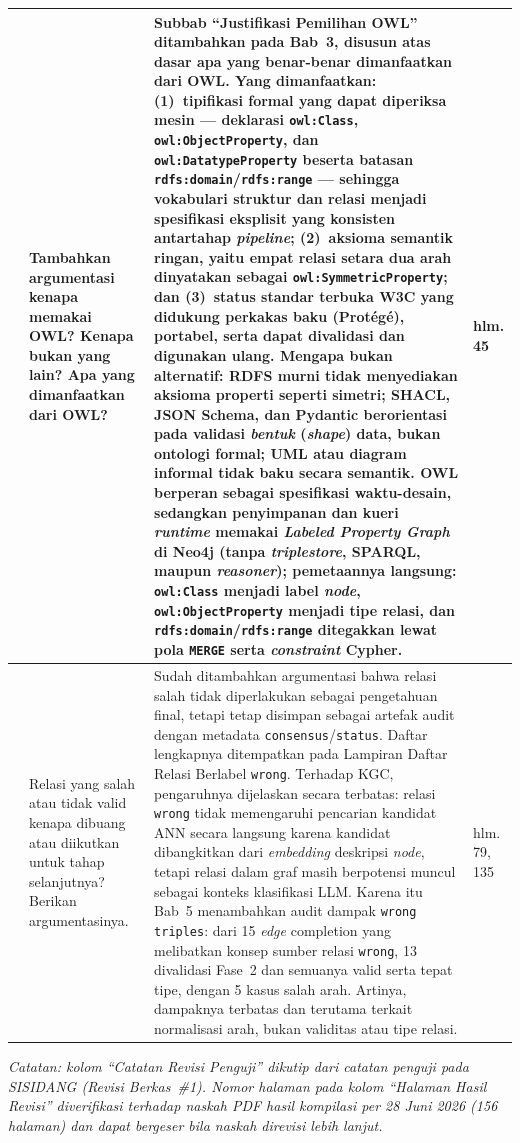 \documentclass[12pt, a4paper]{article}
\begin{document}
\begin{longtable}{|
  >{\centering\arraybackslash}p{\revisionNoCol}|
  p{\revisionNoteCol}|
  p{\revisionResultCol}|
  >{\centering\arraybackslash}p{\revisionPageCol}|}
\hline
12 & Tambahkan argumentasi kenapa memakai OWL? Kenapa bukan yang lain? Apa
yang dimanfaatkan dari OWL? &
Subbab ``Justifikasi Pemilihan OWL'' ditambahkan pada Bab~3, disusun atas
dasar apa yang benar-benar dimanfaatkan dari OWL. \textbf{Yang dimanfaatkan:}
(1)~tipifikasi formal yang dapat diperiksa mesin --- deklarasi
\texttt{owl:Class}, \texttt{owl:ObjectProperty}, dan
\texttt{owl:DatatypeProperty} beserta batasan
\texttt{rdfs:domain}/\texttt{rdfs:range} --- sehingga vokabulari struktur dan
relasi menjadi spesifikasi eksplisit yang konsisten antartahap
\textit{pipeline}; (2)~aksioma semantik ringan, yaitu empat relasi setara dua
arah dinyatakan sebagai \texttt{owl:SymmetricProperty}; dan (3)~status standar
terbuka W3C yang didukung perkakas baku (Prot\'eg\'e), portabel, serta dapat
divalidasi dan digunakan ulang. \textbf{Mengapa bukan alternatif:} RDFS murni
tidak menyediakan aksioma properti seperti simetri; SHACL, JSON Schema, dan
Pydantic berorientasi pada validasi \textit{bentuk} (\textit{shape}) data,
bukan ontologi formal; UML atau diagram informal tidak baku secara semantik.
OWL berperan sebagai \textbf{spesifikasi waktu-desain}, sedangkan penyimpanan
dan kueri \textit{runtime} memakai \textit{Labeled Property Graph} di Neo4j
(tanpa \textit{triplestore}, SPARQL, maupun \textit{reasoner}); pemetaannya
langsung: \texttt{owl:Class} menjadi label \textit{node},
\texttt{owl:ObjectProperty} menjadi tipe relasi, dan
\texttt{rdfs:domain}/\texttt{rdfs:range} ditegakkan lewat pola \texttt{MERGE}
serta \textit{constraint} Cypher. &
hlm. 45 \\
\hline
13 & Relasi yang salah atau tidak valid kenapa dibuang atau diikutkan untuk
tahap selanjutnya? Berikan argumentasinya. &
Sudah ditambahkan argumentasi bahwa relasi salah tidak diperlakukan sebagai
pengetahuan final, tetapi tetap disimpan sebagai artefak audit dengan metadata
\texttt{consensus}/\texttt{status}. Daftar lengkapnya ditempatkan pada Lampiran
Daftar Relasi Berlabel \texttt{wrong}. Terhadap KGC, pengaruhnya dijelaskan
secara terbatas: relasi \texttt{wrong} tidak memengaruhi pencarian kandidat ANN
secara langsung karena kandidat dibangkitkan dari \textit{embedding} deskripsi
\textit{node}, tetapi relasi dalam graf masih berpotensi muncul sebagai konteks
klasifikasi LLM. Karena itu Bab~5 menambahkan audit dampak \texttt{wrong
triples}: dari 15 \textit{edge} completion yang melibatkan konsep sumber relasi
\texttt{wrong}, 13 divalidasi Fase~2 dan semuanya valid serta tepat tipe, dengan
5 kasus salah arah. Artinya, dampaknya terbatas dan terutama terkait normalisasi
arah, bukan validitas atau tipe relasi. &
hlm. 79, 135 \\
\hline

\end{longtable}

\vspace{0.3cm}
\noindent\small\textit{Catatan: kolom ``Catatan Revisi Penguji'' dikutip dari
catatan penguji pada SISIDANG (Revisi Berkas~\#1). Nomor halaman pada kolom
``Halaman Hasil Revisi'' diverifikasi terhadap naskah PDF hasil kompilasi per
28 Juni 2026 (156 halaman) dan dapat bergeser bila naskah direvisi lebih lanjut.}
\end{document}
